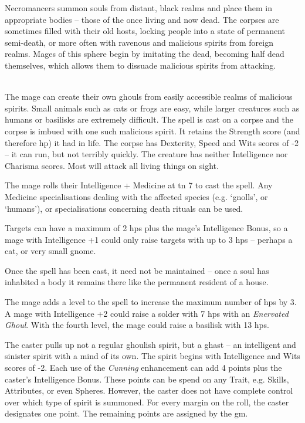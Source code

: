 
\begin{multicols}{2}

\noindent
Necromancers summon souls from distant, black realms and place them in appropriate bodies -- those of the once living and now dead. The corpses are sometimes filled with their old hosts, locking people into a state of permanent semi-death, or more often with ravenous and malicious spirits from foreign realms. Mages of this sphere begin by imitating the dead, becoming half dead themselves, which allows them to dissuade malicious spirits from attacking.

\spelllevel

\\
The mage can create their own ghouls from easily accessible realms of malicious spirits.
Small animals such as cats or frogs are easy, while larger creatures such as humans or basilisks are extremely difficult.
The spell is cast on a corpse and the corpse is imbued with one such malicious spirit.
It retains the Strength score (and therefore \gls{hp}) it had in life.
The corpse has Dexterity, Speed and Wits scores of -2 -- it can run, but not terribly quickly.
The creature has neither Intelligence nor Charisma scores. Most will attack all living things on sight.

The mage rolls their Intelligence + Medicine at \gls{tn} 7 to cast the spell.
Any Medicine specialisations dealing with the affected species (e.g. `gnolls', or `humans'), or specialisations concerning death rituals can be used.

Targets can have a maximum of 2 \glspl{hp} plus the mage's Intelligence Bonus, so a mage with Intelligence +1 could only raise targets with up to 3 \glspl{hp} -- perhaps a cat, or very small gnome.

Once the spell has been cast, it need not be maintained -- once a soul has inhabited a body it remains there like the permanent resident of a house.

The mage adds a level to the spell to increase the maximum number of \glspl{hp} by 3.
A mage with Intelligence +2 could raise a solder with 7 \glspl{hp} with an \textit{Enervated Ghoul}.
With the fourth level, the mage could raise a basilisk with 13 \glspl{hp}.

The caster pulls up not a regular ghoulish spirit, but a ghast -- an intelligent and sinister spirit with a mind of its own.
The spirit begins with Intelligence and Wits scores of -2.
Each use of the \textit{Cunning} enhancement can add 4 points plus the caster's Intelligence Bonus.
These points can be spend on any Trait, e.g. Skills, Attributes, or even Spheres.
However, the caster does not have complete control over which type of spirit is summoned.
For every margin on the roll, the caster designates one point.
The remaining points are assigned by the \gls{gm}.


\end{multicols}
